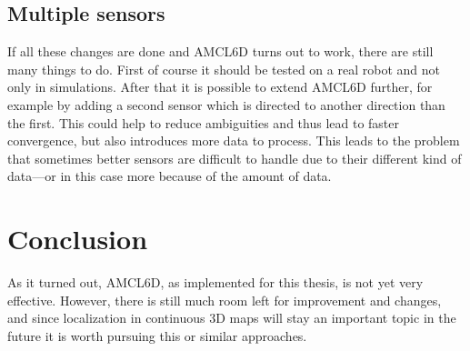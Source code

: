 \documentclass[Thesis.tex]{subfiles}
\begin{document}
\subsection*{Multiple sensors}

If all these changes are done and \gls{AMCL6D} turns out to work, there are still many things to do. First of course it should be tested on a real robot and not only in simulations. After that it is possible to extend \gls{AMCL6D} further, for example by adding a second sensor which is directed to another direction than the first. This could help to reduce ambiguities and thus lead to faster convergence, but also introduces more data to process. This leads to the problem that sometimes better sensors are difficult to handle due to their different kind of data\cite[]{Smithers:1994}---or in this case more because of the amount of data.

\section*{Conclusion}

As it turned out, \gls{AMCL6D}, as implemented for this thesis, is not yet very effective. However, there is still much room left for improvement and changes, and since localization in continuous 3D maps will stay an important topic in the future it is worth pursuing this or similar approaches. 
\end{document}
